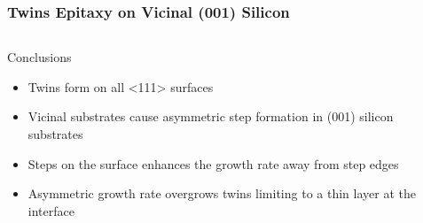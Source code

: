 \documentclass[]{beamer}%
\begin{document}
\begin{frame}
    \frametitle{Twins Epitaxy on Vicinal (001) Silicon}
    \begin{columns}[C]
        \begin{column}{0.5\textwidth}
    \begin{block}{Conclusions}
        \begin{itemize}[<+-| alert@+>]
            \item Twins form on all <111> surfaces
             \item Vicinal substrates cause asymmetric step formation in (001) silicon substrates
             \item Steps on the surface enhances the growth rate away from step edges
            \item Asymmetric growth rate overgrows twins limiting to a thin layer at the interface
        \end{itemize}
    \end{block}
\end{column}
\begin{column}{0.5\textwidth}
    \centering
    \vspace{0.25cm} \\

\end{column}
\end{columns}
\end{frame}
\end{document}
